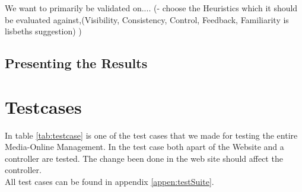 We want to primarily be validated on....
(- choose the Heuristics which it should be evaluated against,(Visibility, Consistency, Control, Feedback, Familiarity is lisbeths suggestion) ) 


\subsection{Presenting the Results}

\section{Testcases}
\label{sec:testcase}
In table \ref{tab:testcase} is one of the test cases that we made for testing the entire Media-Online Management. In the test case both apart of the Website and a controller are tested. The change been done in the web site should affect the controller.\\ 
 All test cases can be found in appendix \vref{appen:testSuite}.
